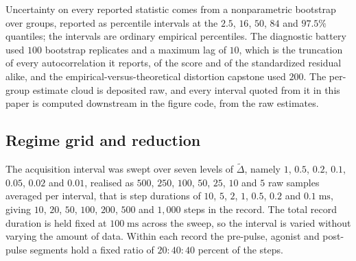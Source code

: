 Uncertainty on every reported statistic comes from a nonparametric bootstrap over
groups, reported as percentile intervals at the $2.5$, $16$, $50$, $84$ and
$97.5\%$ quantiles; the intervals are ordinary empirical percentiles.
The diagnostic battery used $100$ bootstrap replicates and a maximum lag of $10$, which
is the truncation of every autocorrelation it reports, of the score and of the
standardized residual alike, and the empirical-versus-theoretical distortion capstone
used $200$.
The per-group estimate cloud is deposited raw, and every interval quoted from it in this paper
is computed downstream in the figure code, from the raw estimates.

\subsection*{Regime grid and reduction}

The acquisition interval was swept over seven levels of $\widetilde{\Delta}$, namely
$1$, $0.5$, $0.2$, $0.1$, $0.05$, $0.02$ and $0.01$, realised as
$500$, $250$, $100$, $50$, $25$, $10$ and $5$ raw samples averaged per interval,
that is step durations of $10$, $5$, $2$, $1$, $0.5$, $0.2$ and $0.1\;\mathrm{ms}$,
giving $10$, $20$, $50$, $100$, $200$, $500$ and $1{,}000$ steps in the record.
The total record duration is held fixed at $100\;\mathrm{ms}$ across the sweep, so
the interval is varied without varying the amount of data. Within each record the
pre-pulse, agonist and post-pulse segments hold a fixed ratio of $20{:}40{:}40$
percent of the steps.

